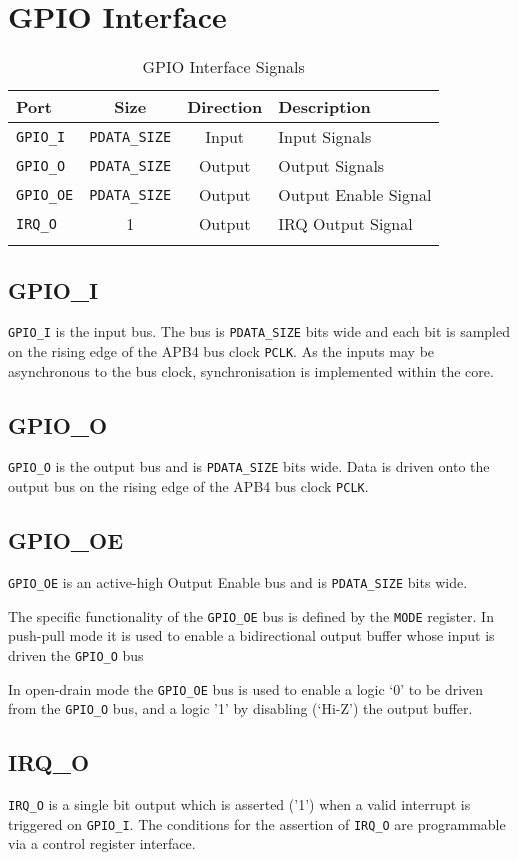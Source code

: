 \section{GPIO Interface}\label{gpio-interface}

\begin{longtable}[]{@{}lccl@{}}
\toprule
Port & Size & Direction & Description\tabularnewline
\midrule
\endhead
\texttt{GPIO\_I} & \texttt{PDATA\_SIZE} & Input & Input Signals\tabularnewline
\texttt{GPIO\_O} & \texttt{PDATA\_SIZE} & Output & Output Signals\tabularnewline
\texttt{GPIO\_OE} & \texttt{PDATA\_SIZE} & Output & Output Enable Signal\tabularnewline
\texttt{IRQ\_O} & 1 & Output & IRQ Output Signal\tabularnewline
\bottomrule
\caption{GPIO Interface Signals}
\end{longtable}

\subsection{GPIO\_I}\label{gpio_i}

\texttt{GPIO\_I} is the input bus. The bus is \texttt{PDATA\_SIZE} bits wide and each bit
is sampled on the rising edge of the APB4 bus clock \texttt{PCLK}. As the inputs
may be asynchronous to the bus clock, synchronisation is implemented
within the core.

\subsection{GPIO\_O}\label{gpio_o}

\texttt{GPIO\_O} is the output bus and is \texttt{PDATA\_SIZE} bits wide. Data is driven
onto the output bus on the rising edge of the APB4 bus clock \texttt{PCLK}.

\subsection{GPIO\_OE}\label{gpio_oe}

\texttt{GPIO\_OE} is an active-high Output Enable bus and is \texttt{PDATA\_SIZE} bits
wide.

The specific functionality of the \texttt{GPIO\_OE} bus is defined by the \texttt{MODE}
register. In push-pull mode it is used to enable a bidirectional output
buffer whose input is driven the \texttt{GPIO\_O} bus

In open-drain mode the \texttt{GPIO\_OE} bus is used to enable a logic `0' to be
driven from the \texttt{GPIO\_O} bus, and a logic '1' by disabling (`Hi-Z') the
output buffer.

\subsection{IRQ\_O}\label{irq_o}

\texttt{IRQ\_O} is a single bit output which is asserted ('1') when a valid interrupt is triggered on \texttt{GPIO\_I}. The conditions for the assertion of \texttt{IRQ\_O} are programmable via a control register interface.

